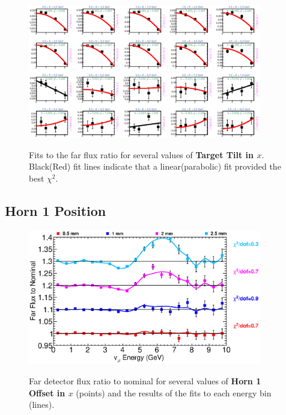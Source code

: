 \begin{figure}[hb]
  \begin{center}
    {\includegraphics[width=4.0in]{figures/TargetXTilt_far_fits.eps}}
  \end{center}
\caption{ Fits to the far flux ratio for several values of {\bf Target Tilt in $x$}. Black(Red) fit lines indicate that a linear(parabolic) fit provided the best $\chi^2$. }
\end{figure}

\clearpage
\subsection{Horn 1 Position}

\begin{figure}[ht]
  \begin{center}
    {\includegraphics[width=4.0in]{figures/Horn1XOffset_far_summary.eps}}
  \end{center}
\caption{ Far detector flux ratio to nominal for several values of {\bf Horn 1 Offset in $x$} (points) and the results of the fits to each energy bin (lines).}
\end{figure}

